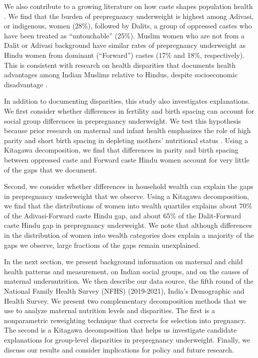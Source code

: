 \documentclass[12pt]{article}
\begin{document}
We also contribute to a growing literature on how caste shapes population health  \citep{vyas2022social, gupta2020caste, coffey2019local, lopalo2019consequences, bora2019persistent}. We find that the burden of prepregnancy underweight is highest among Adivasi, or indigenous, women (28\%), followed by Dalits, a group of oppressed castes who have been treated as ``untouchable'' (25\%).  Muslim women who are not from a Dalit or Adivasi background have similar rates of prepregnancy underweight as Hindu women from dominant (``Forward'') castes (17\% and 18\%, respectively).  This is consistent with research on health disparities that documents health advantages among Indian Muslims relative to Hindus, despite socioeconomic disadvantage \citep{guillot2010hindu, bhalotra2010puzzle, visaria2015preference, geruso2018neighborhood, sharma_gupta_2025}.  

In addition to documenting disparities, this study also investigates explanations. We first consider whether differences in fertility and birth spacing can account for social group differences in prepregnancy underweight.  We test this hypothesis because prior research on maternal and infant health emphasizes the role of high parity and short birth spacing in depleting mothers' nutritional status \citep{winkvist1992new}.  Using a Kitagawa decomposition, we find that differences in parity and birth spacing between oppressed caste and Forward caste Hindu women account for very little of the gaps that we document.  

Second, we consider whether differences in household wealth can explain the gaps in prepregnancy underweight that we observe.  Using a Kitagawa decomposition, we find that the distributions of women into wealth quartiles explains about 70\% of the Adivasi-Forward caste Hindu gap, and about 65\% of the Dalit-Forward caste Hindu gap in prepregnancy underweight. We note that although differences in the distribution of women into wealth categories does explain a majority of the gaps we observe, large fractions of the gaps remain unexplained.

In the next section, we present background information on maternal and child health patterns and measurement, on Indian social groups, and on the causes of maternal undernutrition.  We then describe our data source, the fifth round of the National Family Health Survey (NFHS) (2019-2021), India's Demographic and Health Survey.  We present two complementary decomposition methods that we use to analyze maternal nutrition levels and disparities.  The first is a nonparametric reweighting technique that corrects for selection into pregnancy.  The second is a Kitagawa decomposition that helps us investigate candidate explanations for group-level disparities in prepregnancy underweight.  Finally, we discuss our results and consider implications for policy and future research.
\end{document}
